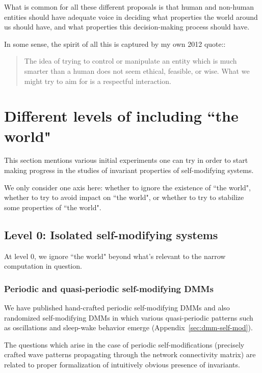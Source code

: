 \documentclass{article}
\begin{document}
What is common for all these different proposals is that human and non-human entities should have adequate
voice in deciding what properties the world around us should have, and what properties this decision-making
process should have. 

In some sense, the spirit of all this is captured by my own 2012 quote::

\begin{quote}
{\small The idea of trying to control or manipulate an entity which is much smarter than a human does not seem ethical, feasible, or wise.
What we might try to aim for is a respectful interaction.} 
\end{quote}

\pagebreak

\section{Different levels of including ``the world"}\label{sec:levels}

This section mentions various initial experiments one can try in order to start making progress
in the studies of invariant properties of self-modifying systems.

We only consider one axis here: whether to ignore the existence of ``the world",
whether to try to avoid impact on ``the world", or whether to try to stabilize some
properties of ``the world".

\subsection{Level 0: Isolated self-modifying systems}

At level 0, we ignore ``the world" beyond what's relevant to the narrow computation in question.

\subsubsection{Periodic and quasi-periodic self-modifying DMMs}

We have published hand-crafted periodic self-modifying DMMs and also randomized
self-modifying DMMs in which various quasi-periodic patterns such as oscillations and
sleep-wake behavior emerge (Appendix~\ref{sec:dmm-self-mod}).

The questions which arise in the case of periodic self-modifications (precisely crafted wave patterns
propagating through the network connectivity matrix) are related to proper formalization of
intuitively obvious presence of invariants.
\end{document}
